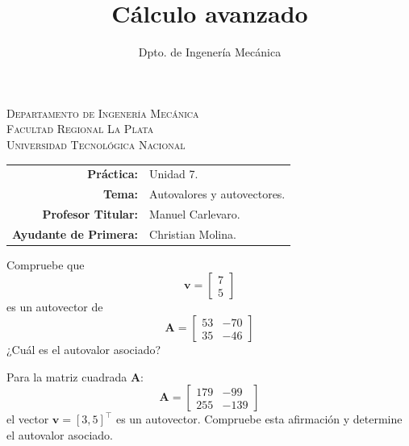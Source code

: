 \documentclass[11pt]{article}
\title{Cálculo avanzado}
\author{Dpto. de Ingenería Mecánica}
\begin{document}

\begin{center}
\end{center}

\begin{center}
	\vspace{\baselineskip}
	\Large{\textsc{Departamento de Ingenería Mecánica}} \\
	\textsc{Facultad Regional La Plata} \\
	\textsc{Universidad Tecnológica Nacional}
\end{center}


\begin{center}
	\begin{tabular}{r l}
		\textbf{Práctica:}            & Unidad 7.                   \\
		\textbf{Tema:}                & Autovalores y autovectores. \\
		\textbf{Profesor Titular:}    & Manuel Carlevaro.           \\
		\textbf{Ayudante de Primera:} & Christian Molina.           \\
	\end{tabular}\end{center}

\vspace{1em}
\begin{question}
	Compruebe que
	\[ \bm{v} = \begin{bmatrix} 7 \\ 5 \end{bmatrix} \]
	es un autovector de
	\[ \bm{A} =
		\begin{bmatrix}
			53 & -70 \\
			35 & -46
		\end{bmatrix} \]
	¿Cuál es el autovalor asociado?
\end{question}

\begin{question} %

	Para la matriz cuadrada $\bm{A}$:
	\[ \bm{A} = \begin{bmatrix} 179 & -99  \\
		                255 & -139\end{bmatrix} \]
	el vector $\bm{v} = [3, 5]^{\intercal}$ es un autovector. Compruebe esta afirmación y determine el autovalor asociado.
\end{question}
\end{document}
